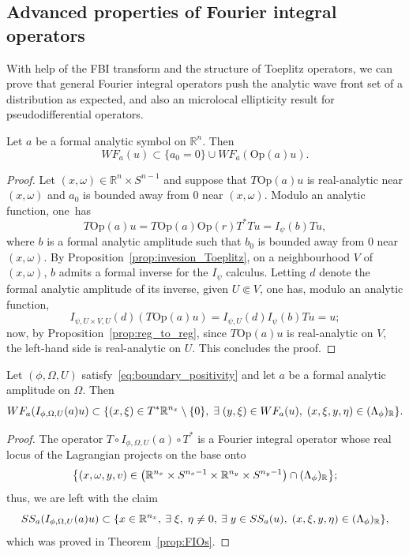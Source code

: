 \documentclass[10pt]{amsart}
\theoremstyle{definition}\newtheorem{defi}[theo]{Definition}\newtheorem{rema}[theo]{Remark}\newtheorem{exam}[theo]{Example}\newtheorem{exem}[theo]{Example}\newtheorem{nota}[theo]{Notation}
\newcommand{\Opp}{\mathrm{Op}}
\newcommand\1{\mathds{1}}
\newcommand{\R}{\mathbb{R}}
\let\oldexists\exists
\renewcommand*{\exists}{\mathrel{\oldexists}}
\let\originalleft\left
\let\originalright\right
\renewcommand{\left}{\mathopen{}\mathclose\bgroup\originalleft}
\renewcommand{\right}{\aftergroup\egroup\originalright}
\begin{document}
\subsection{Advanced properties of Fourier {integral operators}}\label{sec:advanced-properties}

With help of the FBI transform and the structure of Toeplitz operators, we can prove that general Fourier {integral operators} push the analytic wave front set of a distribution as expected, and also an microlocal ellipticity result for pseudodifferential operators.

\begin{prop}\label{prop:WF_Pu}
Let $a$ be a formal analytic symbol on $\R^n$. Then
\[
WF_a(u)\subset \{a_0=0\}\cup WF_a(\Opp(a)u).
\]
\end{prop}
\begin{proof}
Let $(x,\omega)\in \R^n\times S^{n-1}$ and suppose that $T\Opp(a)u$ is real-analytic near $(x,\omega)$ and $a_0$ is bounded away from $0$ near $(x,\omega)$. Modulo an analytic function, one~has
\[
T\Opp(a)u=T\Opp(a)\Opp(r)T^*Tu=I_{\psi}(b)Tu,
\]
where $b$ is a formal analytic amplitude such that $b_0$ is bounded away from $0$ near $(x,\omega)$. By Proposition~\ref{prop:invesion_Toeplitz}, on a neighbourhood $V$ of $(x,\omega)$, $b$ admits a formal inverse for the $I_{\psi}$ calculus. Letting $d$ denote the formal analytic amplitude of its inverse, given $U\Subset V$, one has, modulo an analytic function,
\[
I_{\psi,U\times V,U}(d)(T\Opp(a)u) = I_{\psi,U}(d)I_{\psi}(b)Tu=u;
\]
now, by Proposition~\ref{prop:reg_to_reg}, since $T\Opp(a)u$ is real-analytic on $V$, the left-hand side is real-analytic on $U$. This concludes the proof.
\end{proof}


\begin{prop}\label{prop:FIO-WF}
Let $(\phi,\Omega,U)$ satisfy~\eqref{eq:boundary_positivity} and let $a$ be a formal analytic amplitude on $\Omega$. Then
\[
WF_a(I_{\phi,\Omega,U}(a)u)\subset \left\{(x,\xi)\in T^*\R^{n_x}\setminus \{0\},\;
\exists (y,\xi)\in WF_a(u), \; (x,\xi,y,\eta)\in (\Lambda_{\phi})_{\R}\right\}.
\]
\end{prop}
\begin{proof}
The operator $T\circ I_{\phi,\Omega,U}(a)\circ T^*$ is a Fourier integral operator whose real locus of the Lagrangian projects on the base onto
\[
\left\{(x,\omega,y,v)\in \left(\R^{n_x}\times S^{n_x-1}\times \R^{n_y}\times S^{n_y-1}\right)\cap (\Lambda_{\phi})_{\R}\right\};
\]
thus, we are left with the claim
\[
SS_a(I_{\phi,\Omega,U}(a)u)\subset \left\{x\in \R^{n_x},\: \exists
\xi,\;\eta\neq 0, \:\exists y\in SS_a(u), \;(x,\xi,y,\eta)\in (\Lambda_{\phi})_{\R}\right\},
\]
which was proved in Theorem~\ref{prop:FIOs}.
\end{proof}
\end{document}
